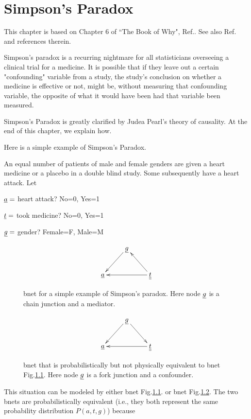 \chapter{Simpson's Paradox}
\label{ch-simpson}
This chapter 
is based on Chapter 6 of 
``The Book of Why", Ref.\cite{book-why}.
See also
Ref.\cite{wiki-simpson}
and references therein.


Simpson's paradox is a recurring 
nightmare for all statisticians 
overseeing a clinical trial for 
a medicine. It is possible that
 if they leave out a certain 
"confounding" variable from a study, 
the study's conclusion on whether
 a medicine is effective or not, might be,
 without measuring that confounding variable, 
the opposite of what it would have 
been had that variable been measured.

Simpson's Paradox is greatly clarified
 by Judea Pearl's theory of causality.
 At the end of this chapter, 
we explain how.

Here is a simple example of 
Simpson's Paradox.

An equal 
number of  patients of male and 
female genders
 are given a heart medicine or a placebo 
in a double blind study.
 Some subsequently have a heart 
attack. Let

$ \underline{a}=$ heart attack? No=0, Yes=1

$ \underline{t}=$ took medicine? No=0, Yes=1

$ \underline{g}=$ gender? Female=F, Male=M



\begin{figure}[h!]
\centering
$$\xymatrix{
&\rvg\ar[dl]&\\
\rva&&\ul{\rvt}\ar[ul]\ar[ll]
}$$
\caption{bnet for a simple example of 
Simpson's paradox.
Here node ${\underline{g}}$ is 
a chain junction and a mediator.}
\label{fig-simpson-chain}
\end{figure}

\begin{figure}[h!]
\centering
$$\xymatrix{
&\rvg\ar[dl]\ar[dr]&\\
\rva&&\ul{\rvt}\ar[ll]
}$$
\caption{bnet that is probabilistically
but not physically
equivalent to bnet
Fig.\ref{fig-simpson-chain}.
Here node ${\underline{g}}$ is 
a fork junction and a confounder.}
\label{fig-simpson-fork}
\end{figure}




This situation can be modeled by 
either
bnet Fig.\ref{fig-simpson-chain}.
or bnet
 Fig.\ref{fig-simpson-fork}.
The two bnets are 
probabilistically
equivalent 
(i.e., they
both represent the same
probability distribution $P(a, t, g)$)
because

